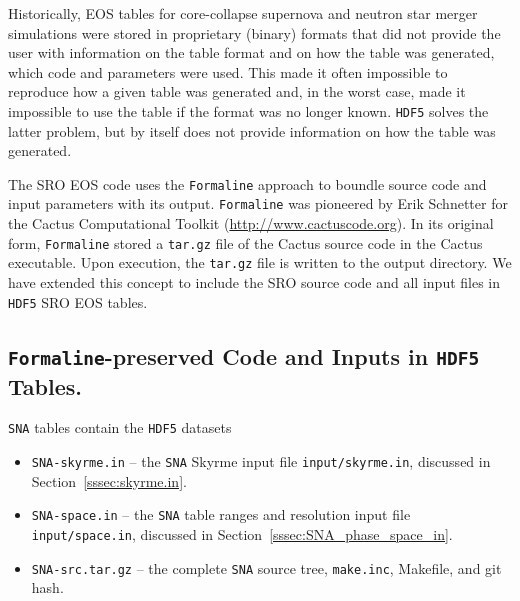 \documentclass[letterpaper,11pt]{refart}
\begin{document}
Historically, EOS tables for core-collapse supernova and neutron star
merger simulations were stored in proprietary (binary) formats that
did not provide the user with information on the table format
and on how the table was generated, which code and parameters were
used. This made it often impossible to reproduce how a given table was
generated and, in the worst case, made it impossible to use the table
if the format was no longer known. \texttt{HDF5} solves the latter
problem, but by itself does not provide information on how the table
was generated.


The SRO EOS code uses the \texttt{Formaline} approach to boundle
source code and input parameters with its output. \texttt{Formaline}
was pioneered by Erik Schnetter for the Cactus Computational Toolkit
(\url{http://www.cactuscode.org}). In its original form,
\texttt{Formaline} stored a \texttt{tar.gz} file of the Cactus source
code in the Cactus executable. Upon execution, the \texttt{tar.gz}
file is written to the output directory. We have extended this concept
to include the SRO source code and all input files in \texttt{HDF5}
SRO EOS tables.

\subsection{\texttt{Formaline}-preserved Code and Inputs in \texttt{HDF5} Tables.}

\texttt{SNA} tables contain the \texttt{HDF5} datasets
\begin{itemize}
\item \texttt{SNA-skyrme.in} -- the \texttt{SNA} Skyrme input file \texttt{\color{red}input/skyrme.in}, discussed in Section~\ref{sssec:skyrme.in}.
\item \texttt{SNA-space.in} -- the \texttt{SNA} table ranges and resolution input file \texttt{\color{red}input/space.in}, discussed in Section~\ref{sssec:SNA_phase_space_in}.
\item \texttt{SNA-src.tar.gz} -- the complete \texttt{SNA} source
  tree, \texttt{make.inc}, Makefile, and git hash.
\end{itemize}
\end{document}
